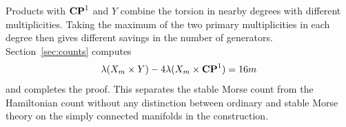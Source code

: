 Products with $\mathbf{CP}^1$ and $Y$ combine the torsion in nearby degrees with
different multiplicities. Taking the maximum of the two primary
multiplicities in each degree then gives different savings in the number
of generators. Section~\ref{sec:counts} computes
\[
 \lambda(X_m\times Y)-4\lambda(X_m\times\mathbf{CP}^1)=16m
\]
and completes the proof. This separates the stable Morse count from the
Hamiltonian count without any distinction between ordinary and stable
Morse theory on the simply connected manifolds in the construction.
